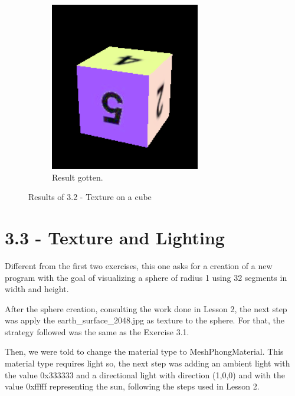 \documentclass[12pt]{article}
\begin{document}
\begin{figure}[!h]
\begin{subfigure}{.5\textwidth}
        \includegraphics[width = \textwidth]{figs/ex_32_2.png}
        \caption{Result gotten.}
        \label{fig:ex_32_2}
    \end{subfigure}
\caption{Results of 3.2 - Texture on a cube}
\label{fig:ex_32}
\end{figure}

\section*{3.3 - Texture and Lighting}
\label{ex_33}

Different from the first two exercises, this one asks for a creation of a new program with the goal of visualizing a sphere of radius 1 using 32 segments in width and height.\par

After the sphere creation, consulting the work done in Lesson 2, the next step was apply the earth\_surface\_2048.jpg as texture to the sphere. For that, the strategy followed was the same as the Exercise 3.1.\par

Then, we were told to change the material type to MeshPhongMaterial. This material type requires light so, the next step was adding an ambient light with the value 0x333333 and a directional light with direction (1,0,0) and with the value 0xfffff representing the sun, following the steps used in Lesson 2.
\end{document}
